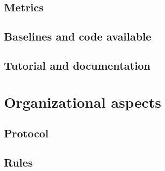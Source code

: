 \documentclass[11pt, oneside]{article}
\begin{document}
\subsection{Metrics}


\subsection{Baselines and code available}


\subsection{Tutorial and documentation}



\section{Organizational aspects}
\subsection{Protocol}



\subsection{Rules}

\end{document}
